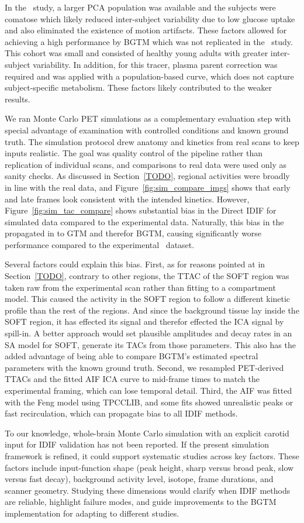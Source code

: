 In the \fdg\ study, a larger PCA population was available and the subjects were comatose which likely reduced inter-subject variability due to low glucose uptake and also eliminated the existence of motion artifacts.
These factors allowed for achieving a high performance by BGTM which was not replicated in the \yohimbine\ study.
This cohort was small and consisted of healthy young adults with greater inter-subject variability.
In addition, for this tracer, plasma parent correction was required and was applied with a population-based curve, which does not capture subject-specific metabolism.
These factors likely contributed to the weaker results.

We ran Monte Carlo PET simulations as a complementary evaluation step with special advantage of examination with controlled conditions and known ground truth.
The simulation protocol drew anatomy and kinetics from real scans to keep inputs realistic.
The goal was quality control of the pipeline rather than replication of individual scans, and comparisons to real data were used only as sanity checks.
As discussed in Section~\ref{TODO}, regional activities were broadly in line with the real data, and Figure~\ref{fig:sim_compare_imgs} shows that early and late frames look consistent with the intended kinetics.
However, Figure~\ref{fig:sim_tac_compare} shows substantial bias in the Direct IDIF for simulated data compared to the experimental data.
Naturally, this bias in the propagated in to GTM and therefor BGTM, causing significantly worse performance compared to the experimental \fdg\ dataset.

Several factors could explain this bias.
First, as for reasons pointed at in Section~\ref{TODO}, contrary to other regions, the TTAC of the SOFT region was taken raw from the experimental scan rather than fitting to a compartment model.
This caused the activity in the SOFT region to follow a different kinetic profile than the rest of the regions.
And since the background tissue lay inside the SOFT region, it has effected its signal and therefor effected the ICA signal by spill-in.
A better approach would set plausible amplitudes and decay rates in an SA model for SOFT, generate its TACs from those parameters.
This also has the added advantage of being able to compare BGTM’s estimated spectral parameters with the known ground truth.
Second, we resampled PET-derived TTACs and the fitted AIF ICA curve to mid-frame times to match the experimental framing, which can lose temporal detail.
Third, the AIF was fitted with the Feng model using TPCCLIB, and some fits showed unrealistic peaks or fast recirculation, which can propagate bias to all IDIF methods.

To our knowledge, whole-brain Monte Carlo simulation with an explicit carotid input for IDIF validation has not been reported.
If the present simulation framework is refined, it could support systematic studies across key factors.
These factors include input-function shape (peak height, sharp versus broad peak, slow versus fast decay), background activity level, isotope, frame durations, and scanner geometry.
Studying these dimensions would clarify when IDIF methods are reliable, highlight failure modes, and guide improvements to the BGTM implementation for adapting to different studies.
